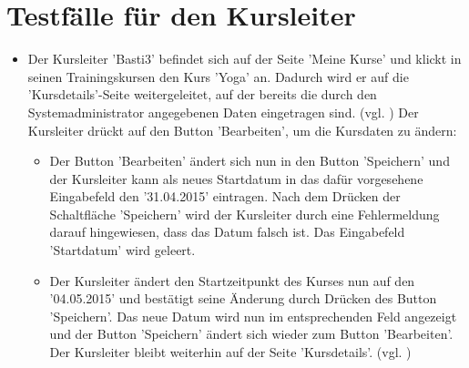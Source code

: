 \documentclass[a4paper]{scrreprt}
\newcounter{Lc}
\newcounter{Hc}
\newcommand{\stepHc}{\stepcounter{Hc}\setcounter{Lc}{0}}
\begin{document}
	\section{Testfälle für den Kursleiter}
		\stepHc
		\begin{itemize}
			\item {} 
			Der Kursleiter 'Basti3' befindet sich auf der Seite 'Meine Kurse' und klickt in seinen Trainingskursen den Kurs 'Yoga' an. Dadurch wird er auf die 'Kursdetails'-Seite weitergeleitet, auf der bereits die durch den Systemadministrator angegebenen Daten eingetragen sind. (vgl. ) Der Kursleiter drückt auf den Button 'Bearbeiten', um die Kursdaten zu ändern:
			\begin{itemize}
				\item Der Button 'Bearbeiten' ändert sich nun in den Button 'Speichern' und der Kursleiter kann als neues Startdatum in das dafür vorgesehene Eingabefeld den '31.04.2015' eintragen. Nach dem Drücken der Schaltfläche 'Speichern' wird der Kursleiter durch eine Fehlermeldung darauf hingewiesen, dass das Datum falsch ist. Das Eingabefeld 'Startdatum' wird geleert.
				
				\item Der Kursleiter ändert den Startzeitpunkt des Kurses nun auf den '04.05.2015' und bestätigt seine Änderung durch Drücken des Button 'Speichern'. Das neue Datum wird nun im entsprechenden Feld angezeigt und der Button 'Speichern' ändert sich wieder zum Button 'Bearbeiten'. Der Kursleiter bleibt weiterhin auf der Seite 'Kursdetails'. (vgl. )
			\end{itemize}
			

\end{itemize}
\end{document}
